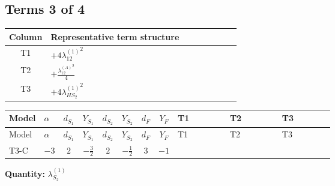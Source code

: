 \documentclass[8pt]{article}
\begin{document}
\begin{landscape}
\subsection*{Terms 3 of 4}
\begin{center}
\begin{tabular}{@{}c >{\raggedright\arraybackslash}p{0.82\linewidth}@{}}
\toprule
Column & Representative term structure \\
\midrule
T1 & \(\displaystyle +4 {\lambda_{12}^{(1)}}^2\) \\
\midrule
T2 & \(\displaystyle +\frac{{\lambda_{12}^{(A)}}^2}{4}\) \\
\midrule
T3 & \(\displaystyle +4 {\lambda_{HS_2}^{(1)}}^2\) \\
\midrule
\bottomrule
\end{tabular}
\end{center}
\smallskip
\tiny
\begin{longtable}{@{}llcccccc >{\raggedright\arraybackslash}p{0.21\linewidth} >{\raggedright\arraybackslash}p{0.21\linewidth} >{\raggedright\arraybackslash}p{0.21\linewidth}@{}}
\toprule
Model & $\alpha$ & $d_{S_1}$ & $Y_{S_1}$ & $d_{S_2}$ & $Y_{S_2}$ & $d_F$ & $Y_F$ & T1 & T2 & T3 \\
\midrule
\endfirsthead
\toprule
Model & $\alpha$ & $d_{S_1}$ & $Y_{S_1}$ & $d_{S_2}$ & $Y_{S_2}$ & $d_F$ & $Y_F$ & T1 & T2 & T3 \\
\midrule
\endhead
T3-C & $-3$ & $2$ & $-\frac{3}{2}$ & $2$ & $-\frac{1}{2}$ & $3$ & $-1$ & \scriptsize\adjustbox{max width=\linewidth}{$\begin{gathered} +4 {\lambda_{12}^{(1)}}^2\end{gathered}$} & \scriptsize\adjustbox{max width=\linewidth}{$\begin{gathered} +\frac{{\lambda_{12}^{(A)}}^2}{4}\end{gathered}$} & \scriptsize\adjustbox{max width=\linewidth}{$\begin{gathered} +4 {\lambda_{HS_2}^{(1)}}^2\end{gathered}$} \\
\midrule
\bottomrule
\end{longtable}
\clearpage
\noindent\textbf{Quantity: }$\lambda_{S_2}^{(1)}$\par\smallskip

\end{landscape}
\end{document}

